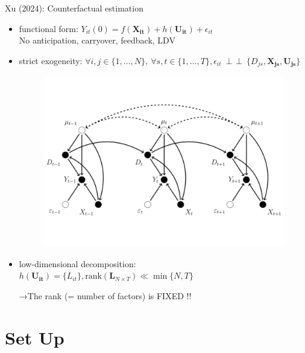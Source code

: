 \documentclass[xcolor=svgnames,aspectratio=169]{beamer}
\newcommand{\indep}{\mathop{\perp\!\!\!\!\perp}}
\begin{document}
\begin{frame}{Xu (2024): Counterfactual estimation}
    \begin{itemize}
        \item functional form: 
        $
        Y_{it}(0)=f(\mathbf{X_{it}})+h(\mathbf{U_{it}})+\epsilon_{it}
        $ \\
        \rightarrow No anticipation, carryover, feedback, LDV
        \item strict exogeneity:
        $
        \forall i,j\in\{1,\dots,N\},\ \forall s,t\in\{1,\dots,T\}, \epsilon_{it}\ \indep\ \{D_{js}, \mathbf{X_{js}}, \mathbf{U_{js}}\}
        $
        \begin{figure}
            \includegraphics[width=\textwidth, height=0.4\textheight, keepaspectratio]{Xu_DAG.pdf}
        \end{figure}
        \item low-dimensional decomposition:
        $
        h(\mathbf{U_{it}})=\{L_{it}\}, \mathrm{rank}(\mathbf{L}_{N\times T}) \ll \min\{N,T\}
        $

        →The rank (= number of factors) is \alert{FIXED !!}
    \end{itemize}
\end{frame}

\section{Set Up}
\end{document}
